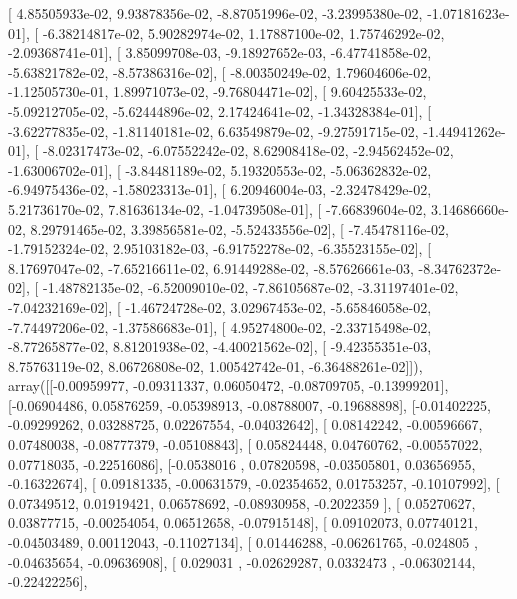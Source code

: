 \documentclass{article}
\begin{document}
       [  4.85505933e-02,   9.93878356e-02,  -8.87051996e-02,
         -3.23995380e-02,  -1.07181623e-01],
       [ -6.38214817e-02,   5.90282974e-02,   1.17887100e-02,
          1.75746292e-02,  -2.09368741e-01],
       [  3.85099708e-03,  -9.18927652e-03,  -6.47741858e-02,
         -5.63821782e-02,  -8.57386316e-02],
       [ -8.00350249e-02,   1.79604606e-02,  -1.12505730e-01,
          1.89971073e-02,  -9.76804471e-02],
       [  9.60425533e-02,  -5.09212705e-02,  -5.62444896e-02,
          2.17424641e-02,  -1.34328384e-01],
       [ -3.62277835e-02,  -1.81140181e-02,   6.63549879e-02,
         -9.27591715e-02,  -1.44941262e-01],
       [ -8.02317473e-02,  -6.07552242e-02,   8.62908418e-02,
         -2.94562452e-02,  -1.63006702e-01],
       [ -3.84481189e-02,   5.19320553e-02,  -5.06362832e-02,
         -6.94975436e-02,  -1.58023313e-01],
       [  6.20946004e-03,  -2.32478429e-02,   5.21736170e-02,
          7.81636134e-02,  -1.04739508e-01],
       [ -7.66839604e-02,   3.14686660e-02,   8.29791465e-02,
          3.39856581e-02,  -5.52433556e-02],
       [ -7.45478116e-02,  -1.79152324e-02,   2.95103182e-03,
         -6.91752278e-02,  -6.35523155e-02],
       [  8.17697047e-02,  -7.65216611e-02,   6.91449288e-02,
         -8.57626661e-03,  -8.34762372e-02],
       [ -1.48782135e-02,  -6.52009010e-02,  -7.86105687e-02,
         -3.31197401e-02,  -7.04232169e-02],
       [ -1.46724728e-02,   3.02967453e-02,  -5.65846058e-02,
         -7.74497206e-02,  -1.37586683e-01],
       [  4.95274800e-02,  -2.33715498e-02,  -8.77265877e-02,
          8.81201938e-02,  -4.40021562e-02],
       [ -9.42355351e-03,   8.75763119e-02,   8.06726808e-02,
          1.00542742e-01,  -6.36488261e-02]]), array([[-0.00959977, -0.09311337,  0.06050472, -0.08709705, -0.13999201],
       [-0.06904486,  0.05876259, -0.05398913, -0.08788007, -0.19688898],
       [-0.01402225, -0.09299262,  0.03288725,  0.02267554, -0.04032642],
       [ 0.08142242, -0.00596667,  0.07480038, -0.08777379, -0.05108843],
       [ 0.05824448,  0.04760762, -0.00557022,  0.07718035, -0.22516086],
       [-0.0538016 ,  0.07820598, -0.03505801,  0.03656955, -0.16322674],
       [ 0.09181335, -0.00631579, -0.02354652,  0.01753257, -0.10107992],
       [ 0.07349512,  0.01919421,  0.06578692, -0.08930958, -0.2022359 ],
       [ 0.05270627,  0.03877715, -0.00254054,  0.06512658, -0.07915148],
       [ 0.09102073,  0.07740121, -0.04503489,  0.00112043, -0.11027134],
       [ 0.01446288, -0.06261765, -0.024805  , -0.04635654, -0.09636908],
       [ 0.029031  , -0.02629287,  0.0332473 , -0.06302144, -0.22422256],
\end{document}
